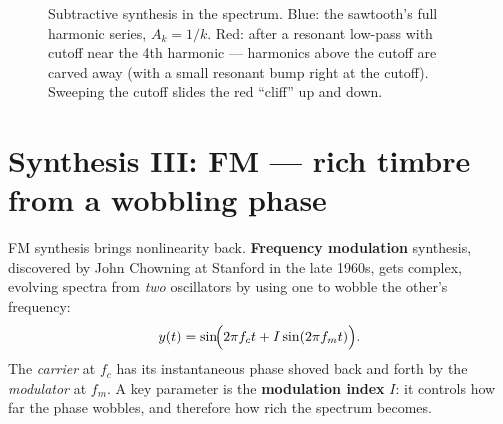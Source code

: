 \begin{figure}[H]
\centering
{}
\caption{Subtractive synthesis in the spectrum. Blue: the sawtooth's full harmonic
series, $A_k=1/k$. Red: after a resonant low-pass with cutoff near the 4th
harmonic --- harmonics above the cutoff are carved away (with a small resonant
bump right at the cutoff). Sweeping the cutoff slides the red ``cliff'' up and
down.}
\label{ch28:fig-subtractive}
\end{figure}

\section{Synthesis III: FM --- rich timbre from a wobbling phase}
\label{ch28:fm}

FM synthesis brings nonlinearity back. \textbf{Frequency
modulation} synthesis, discovered by John Chowning at Stanford in the late 1960s,
gets complex, evolving spectra from \emph{two} oscillators by
using one to wobble the other's frequency:
\begin{equation}
\label{ch28:fm-eq}
y(t)=\sin\!\Bigl(2\pi f_c t + I\sin(2\pi f_m t)\Bigr).
\end{equation}
The \emph{carrier} at $f_c$ has its instantaneous phase shoved back and forth by
the \emph{modulator} at $f_m$. A key parameter is the
\textbf{modulation index} $I$: it controls how far the phase wobbles, and
therefore how rich the spectrum becomes.


